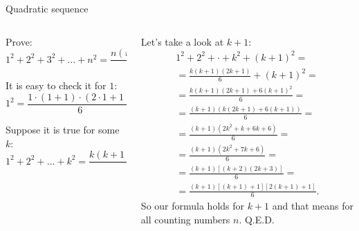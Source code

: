 \documentclass[9pt,aspectratio=169,handout]{beamer}
\begin{document}
\begin{frame}{Quadratic sequence}
  \begin{columns}[T]
    \begin{column}{0.5\textwidth}
      \begin{problem}
        Prove:
        \[
          1^2 + 2^2 + 3^2 + \dots + n^2 = \frac{n (n+1)(2n+1)}{6}.
        \]
      \end{problem}\pause
      It is easy to check it for $1$:
      \[ 1^2 = \frac{1 \cdot (1 + 1) \cdot (2 \cdot 1 + 1)}{6} = \frac{1 \cdot 2 \cdot 3}{6} = 1. \]\pause

      Suppose it is true for some $k$:
      \[
        1^2 + 2^2 + \dots + k^2 = \frac{k (k+1)(2k+1)}{6}.
      \]\pause
    \end{column}
    \begin{column}{0.5\textwidth}
      Let's take a look at $k+1$:
      \begin{multline*}
        1^2 + 2^2 + \cdot + k^2 + (k+1)^2 = \\
        = \frac{k (k+1)(2k+1)}{6} + (k + 1)^2 = \\
        = \frac{k (k + 1) (2k + 1) + 6(k + 1)^2}{6} = \\
        = \frac{(k+1)( k(2k + 1) + 6(k + 1))}{6} = \\
        = \frac{(k+1) ( 2k^2 + k + 6k + 6)}{6} = \\
        = \frac{(k+1) ( 2k^2 + 7k + 6)}{6} = \\
        = \frac{(k+1) [ (k + 2) (2k + 3) ]}{6} = \\
        = \frac{(k+1) [(k + 1) + 1] [2(k + 1) + 1]}{6}.
      \end{multline*}\pause
      So our formula holds for $k+1$ and that means for all counting numbers $n$. \hfill Q.E.D.
    \end{column}
  \end{columns}
\end{frame}
\end{document}
